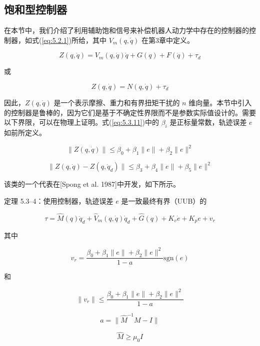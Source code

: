 \documentclass[UTF8,12pt,a4paper]{ctexart}
\begin{document}
\subsection{饱和型控制器}

在本节中，我们介绍了利用辅助饱和信号来补偿机器人动力学中存在的控制器的控制器，如式(\ref{eq:5.2.1})所给，其中 $V_m(q, \dot{q})$ 在第3章中定义。

\begin{equation}\label{eq:5.3.8}
Z(q, \dot{q}) = V_m(q, \dot{q})\dot{q} + G(q) + F(\dot{q}) + \tau_d
\end{equation}

或

\begin{equation}\label{eq:5.3.9}
Z(q, \dot{q}) = N(q, \dot{q}) + \tau_d
\end{equation}

因此，$Z(q, \dot{q})$ 是一个表示摩擦、重力和有界扭矩干扰的 $n$ 维向量。本节中引入的控制器是鲁棒的，因为它们是基于不确定性界限而不是参数实际值设计的。需要以下界限，可以在物理上证明。式(\ref{eq:5.3.11})中的 $\beta_i$ 是正标量常数，轨迹误差 $e$ 如前所定义。

\begin{equation}\label{eq:5.3.10}
\|Z(q, \dot{q})\| \leq \beta_0 + \beta_1\|e\| + \beta_2\|e\|^2
\end{equation}

\begin{equation}\label{eq:5.3.11}
\|Z(q, \dot{q}) - Z(q, \dot{q}_d)\| \leq \beta_3 + \beta_4\|e\| + \beta_5\|e\|^2
\end{equation}

该类的一个代表在[Spong et al. 1987]中开发，如下所示。

\begin{theorem}\label{thm:5.3.4}
定理 5.3--4：使用控制器，轨迹误差 $e$ 是一致最终有界（UUB）的

\begin{equation}
\tau = \hat{M}(q)\ddot{q}_d + \hat{V}_m(q, \dot{q})\dot{q}_d + \hat{G}(q) + K_v \dot{e} + K_p e + v_r
\end{equation}

其中

\begin{equation}
v_r = \frac{\beta_0 + \beta_1\|e\| + \beta_2\|e\|^2}{1 - a}\text{sgn}(e)
\end{equation}

和

\begin{equation}
\|v_r\| \leq \frac{\beta_0 + \beta_1\|e\| + \beta_2\|e\|^2}{1 - a}
\end{equation}

\begin{equation}
a = \|\hat{M}^{-1}M - I\|
\end{equation}

\begin{equation}
\hat{M} \geq \mu_0 I
\end{equation}
\end{theorem}
\end{document}
